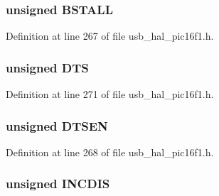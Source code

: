 \hypertarget{union___b_d___s_t_a_t_a145ee75f12c62d2a89097d18477019f2}{}
\subsubsection[{B\+S\+T\+A\+L\+L}]{\setlength{\rightskip}{0pt plus 5cm}unsigned B\+S\+T\+A\+L\+L}\label{union___b_d___s_t_a_t_a145ee75f12c62d2a89097d18477019f2}


Definition at line 267 of file usb\+\_\+hal\+\_\+pic16f1.\+h.

\hypertarget{union___b_d___s_t_a_t_a74db087bfe32cd33c459191f7a4aeb13}{}
\subsubsection[{D\+T\+S}]{\setlength{\rightskip}{0pt plus 5cm}unsigned D\+T\+S}\label{union___b_d___s_t_a_t_a74db087bfe32cd33c459191f7a4aeb13}


Definition at line 271 of file usb\+\_\+hal\+\_\+pic16f1.\+h.

\hypertarget{union___b_d___s_t_a_t_adeff6f5de2d8ca0cfa956560288c3541}{}
\subsubsection[{D\+T\+S\+E\+N}]{\setlength{\rightskip}{0pt plus 5cm}unsigned D\+T\+S\+E\+N}\label{union___b_d___s_t_a_t_adeff6f5de2d8ca0cfa956560288c3541}


Definition at line 268 of file usb\+\_\+hal\+\_\+pic16f1.\+h.

\hypertarget{union___b_d___s_t_a_t_a39604d4252cc3e5f9551bd2cd3b54584}{}
\subsubsection[{I\+N\+C\+D\+I\+S}]{\setlength{\rightskip}{0pt plus 5cm}unsigned I\+N\+C\+D\+I\+S}\label{union___b_d___s_t_a_t_a39604d4252cc3e5f9551bd2cd3b54584}


